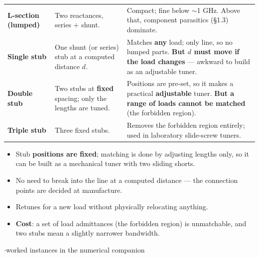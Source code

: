 {\begin{tabularx}{\linewidth}{@{}L{2.05cm}X X@{}}
\textbf{L-section (lumped)} & Two reactances, series $+$ shunt. & Compact; fine below $\sim$1 GHz. Above that, component parasitics (\S1.3) dominate. \\
\textbf{Single stub} & One shunt (or series) stub at a computed distance $d$. & Matches \textbf{any} load; only line, so no lumped parts. \textbf{But $d$ must move if the load changes} --- awkward to build as an adjustable tuner. \\
\textbf{Double stub} & Two stubs at \textbf{fixed} spacing; only the lengths are tuned. & Positions are pre-set, so it makes a practical \textbf{adjustable} tuner. \textbf{But a range of loads cannot be matched} (the forbidden region). \\
\textbf{Triple stub} & Three fixed stubs. & Removes the forbidden region entirely; used in laboratory slide-screw tuners. \\
\bottomrule
\end{tabularx}
\vspace{2pt}
\begin{itemize}
  \item Stub \textbf{positions are fixed}; matching is done by adjusting lengths only, so
    it can be built as a mechanical tuner with two sliding shorts.
  \item No need to break into the line at a computed distance --- the connection points are
    decided at manufacture.
  \item Retunes for a new load without physically relocating anything.
  \item \textbf{Cost}: a set of load admittances (the forbidden region) is unmatchable, and
    two stubs mean a slightly narrower bandwidth.
\end{itemize}}

\vspace{2pt}


{\color{sub}\footnotesize {}  \gap$\cdot$\gap worked instances in the numerical companion}

